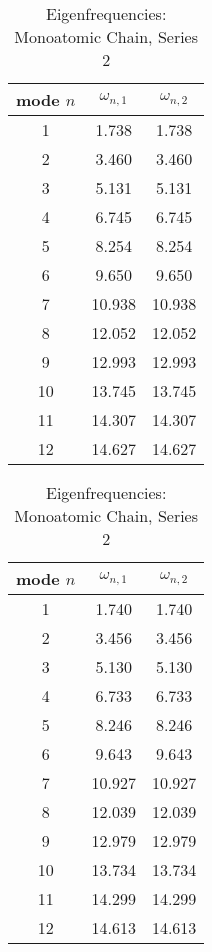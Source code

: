 \Appendix
\configureappendix

\def \hfillx {\hspace*{-\textwidth} \hfill}

\begin{table}
	\begin{minipage}{0.5\textwidth}
		\centering
		\caption{Eigenfrequencies: Monoatomic Chain, Series 1}
		\label{tab:eigenfreqs_a1_1a}
		\begin{tabular}{S|SS}
			\toprule
			{mode $n$}	&	{$\omega_{n,\text{1}}$}	&	{$\omega_{n,\text{2}}$} \\
				&	1.738	&	1.738	\\
			2	&	3.460	&	3.460	\\
			3	&	5.131	&	5.131	\\
			4	&	6.745	&	6.745	\\
			5	&	8.254	&	8.254	\\
			6	&	9.650	&	9.650	\\
			7	&	10.938	&	10.938	\\
			8	&	12.052	&	12.052	\\
			9	&	12.993	&	12.993	\\
			10	&	13.745	&	13.745	\\
			11	&	14.307	&	14.307	\\
			12	&	14.627	&	14.627	\\
			\bottomrule
		\end{tabular}
	\end{minipage}
	\hfillx
	\begin{minipage}{0.5\textwidth}
	\centering
	\caption{Eigenfrequencies: Monoatomic Chain, Series 2}
	\label{tab:eigenfreqs_a1_2a}
	\begin{tabular}{S|SS}
		\toprule
		{mode $n$}	&	{$\omega_{n,\text{1}}$}	&	{$\omega_{n,\text{2}}$} \\
			&	1.740	&	1.740	\\
		2	&	3.456	&	3.456	\\
		3	&	5.130	&	5.130	\\
		4	&	6.733	&	6.733	\\
		5	&	8.246	&	8.246	\\
		6	&	9.643	&	9.643	\\
		7	&	10.927	&	10.927	\\
		8	&	12.039	&	12.039	\\
		9	&	12.979	&	12.979	\\
		10	&	13.734	&	13.734	\\
		11	&	14.299	&	14.299	\\
		12	&	14.613	&	14.613	\\
		\bottomrule
	\end{tabular}
	\end{minipage}
\end{table}

